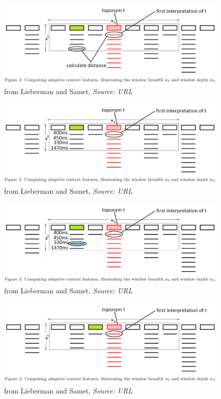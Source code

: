 \documentclass{beamer}
\begin{document}
{\begin{overprint}
		\begin{figure}
			\includegraphics[width=\textwidth]{adaptive-proximity-g.png} 
			\caption{from Lieberman and Samet, \textit{Source: URL}}
		\end{figure}
		
		\begin{figure}
			\includegraphics[width=\textwidth]{adaptive-proximity-h.png} 
			\caption{from Lieberman and Samet, \textit{Source: URL}}
		\end{figure}
		
		\begin{figure}
			\includegraphics[width=\textwidth]{adaptive-proximity-i.png} 
			\caption{from Lieberman and Samet, \textit{Source: URL}}
		\end{figure}
		
		\begin{figure}
			\includegraphics[width=\textwidth]{adaptive-proximity-j.png} 
			\caption{from Lieberman and Samet, \textit{Source: URL}}
		\end{figure}
		

\end{overprint}}
\end{document}
